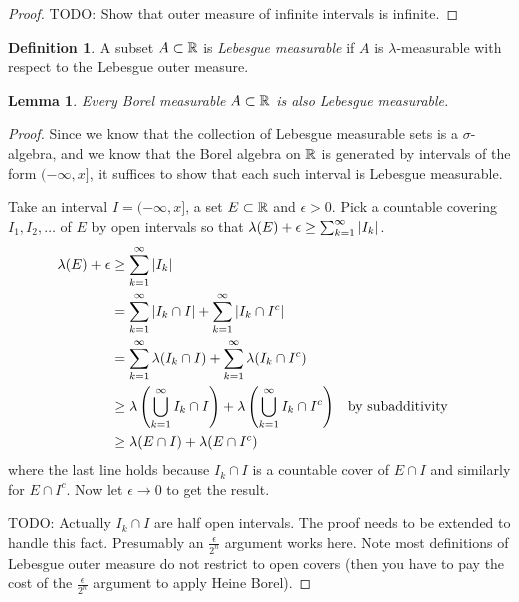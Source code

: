 \documentclass{amsart}
\newtheorem{lem}[thm]{Lemma}
\theoremstyle{remark}
\theoremstyle{definition}
\newtheorem{defn}[thm]{Definition}
\begin{document}
\begin{proof}
TODO: Show that outer measure of infinite intervals is infinite.
\end{proof}

\begin{defn}A subset $A \subset \mathbb{R}$ is \emph{Lebesgue measurable}
  if $A$ is $\lambda$-measurable with respect to the Lebesgue outer measure.
\end{defn}

\begin{lem}\label{BorelsAreLebesgueMeasurable}Every Borel measurable $A \subset \mathbb{R}$ is also Lebesgue measurable.
\end{lem}
\begin{proof}Since we know that the collection of Lebesgue measurable
  sets is a $\sigma$-algebra, and we know that the Borel algebra on
  $\mathbb{R}$ is generated by intervals of the form $(-\infty, x]$, it
  suffices to show that each such interval is Lebesgue measurable.

Take an interval $I=(-\infty, x]$, a set $E \subset \mathbb{R}$ and
$\epsilon > 0$.  Pick a countable covering $I_1, I_2, \dots$ of $E$ by
open intervals so that
$\lambda(E) + \epsilon \geq \sum_{k=1}^\infty \left \vert I_k \right \vert $.
\begin{align*}
\lambda(E) + \epsilon &\geq \sum_{k=1}^\infty \left \vert I_k \right \vert \\
&=\sum_{k=1}^\infty \left \vert I_k \cap I \right \vert  + \sum_{k=1}^\infty \left \vert I_k \cap I^c \right \vert \\
&=\sum_{k=1}^\infty \lambda(I_k \cap I) + \sum_{k=1}^\infty
\lambda(I_k \cap I^c) \\
&\geq \lambda \left ( \bigcup_{k=1}^\infty I_k \cap I \right )
+\lambda \left ( \bigcup_{k=1}^\infty I_k \cap I^c \right ) &
&\text{by subadditivity} \\
&\geq \lambda(E \cap I) + \lambda(E \cap I^c)
\end{align*}
where the last line holds because $I_k \cap I$ is a countable cover of
$E \cap I$ and similarly for $E \cap I^c$.  Now let $\epsilon \to 0$
to get the result.

TODO: Actually $I_k \cap I$ are half open intervals.  The proof needs
to be extended 
to handle this fact.  Presumably an $\frac{\epsilon}{2^n}$ argument
works here.  Note most definitions of Lebesgue outer measure do not
restrict to open covers (then you have to pay the cost of the
$\frac{\epsilon}{2^n}$ argument to apply Heine Borel).
\end{proof}
\end{document}
